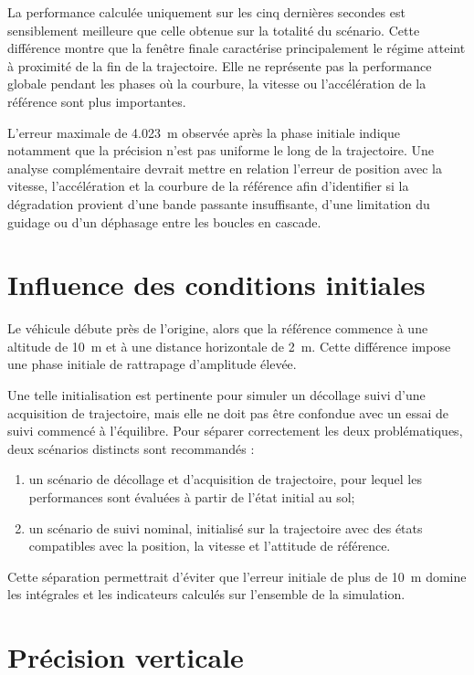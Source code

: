 \documentclass[11pt,a4paper,oneside]{report}
\begin{document}
La performance calculée uniquement sur les cinq dernières secondes est sensiblement meilleure que celle obtenue sur la totalité du scénario. Cette différence montre que la fenêtre finale caractérise principalement le régime atteint à proximité de la fin de la trajectoire. Elle ne représente pas la performance globale pendant les phases où la courbure, la vitesse ou l'accélération de la référence sont plus importantes.

L'erreur maximale de \SI{4.023}{m} observée après la phase initiale indique notamment que la précision n'est pas uniforme le long de la trajectoire. Une analyse complémentaire devrait mettre en relation l'erreur de position avec la vitesse, l'accélération et la courbure de la référence afin d'identifier si la dégradation provient d'une bande passante insuffisante, d'une limitation du guidage ou d'un déphasage entre les boucles en cascade.

\section{Influence des conditions initiales}

Le véhicule débute près de l'origine, alors que la référence commence à une altitude de \SI{10}{m} et à une distance horizontale de \SI{2}{m}. Cette différence impose une phase initiale de rattrapage d'amplitude élevée.

Une telle initialisation est pertinente pour simuler un décollage suivi d'une acquisition de trajectoire, mais elle ne doit pas être confondue avec un essai de suivi commencé à l'équilibre. Pour séparer correctement les deux problématiques, deux scénarios distincts sont recommandés :
\begin{enumerate}
	\item un scénario de décollage et d'acquisition de trajectoire, pour lequel les performances sont évaluées à partir de l'état initial au sol;
	\item un scénario de suivi nominal, initialisé sur la trajectoire avec des états compatibles avec la position, la vitesse et l'attitude de référence.
\end{enumerate}

Cette séparation permettrait d'éviter que l'erreur initiale de plus de \SI{10}{m} domine les intégrales et les indicateurs calculés sur l'ensemble de la simulation.

\section{Précision verticale}
\end{document}
